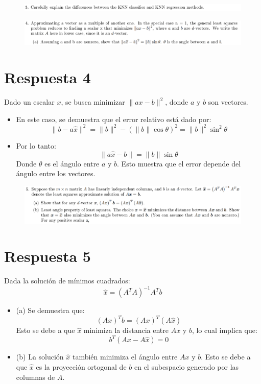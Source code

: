 \documentclass[12pt]{report}
\begin{document}
\begin{figure}[H]
	\centering
	\includegraphics[width=1\textwidth]{screenshot008}
\end{figure}

\begin{figure}[H]
	\centering
	\includegraphics[width=1\textwidth]{screenshot006}
\end{figure}

\section*{Respuesta 4}
Dado un escalar \(x\), se busca minimizar \(\|ax - b\|^2\), donde \(a\) y \(b\) son vectores.

\begin{itemize}
	\item En este caso, se demuestra que el error relativo está dado por:
	\[
	\|b - a\hat{x}\|^2 = \|b\|^2 - (\|b\| \cos \theta)^2 = \|b\|^2 \sin^2 \theta
	\]
	\item Por lo tanto:
	\[
	\|a\hat{x} - b\| = \|b\| \sin \theta
	\]
	Donde \(\theta\) es el ángulo entre \(a\) y \(b\). Esto muestra que el error depende del ángulo entre los vectores.
\end{itemize}


\begin{figure}[H]
	\centering
	\includegraphics[width=1\textwidth]{screenshot007}
\end{figure}

\section*{Respuesta 5}

Dada la solución de mínimos cuadrados:
\[
\hat{x} = \left( A^T A \right)^{-1} A^T b
\]

\begin{itemize}
	\item (a) Se demuestra que:
	\[
	(Ax)^T b = (Ax)^T (A\hat{x})
	\]
	Esto se debe a que \(\hat{x}\) minimiza la distancia entre \(Ax\) y \(b\), lo cual implica que:
	\[
	b^T (Ax - A\hat{x}) = 0
	\]
	
	\item (b) La solución \(\hat{x}\) también minimiza el ángulo entre \(Ax\) y \(b\). Esto se debe a que \(\hat{x}\) es la proyección ortogonal de \(b\) en el subespacio generado por las columnas de \(A\).
\end{itemize}


\printbibliography
\end{document}
